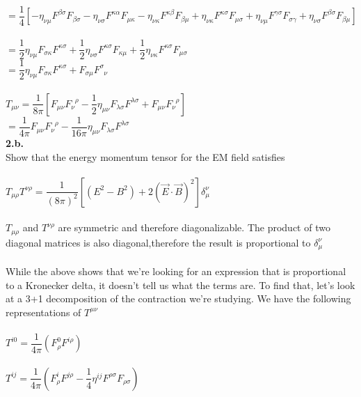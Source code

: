 \documentclass[prb,preprint]
{revtex4-1}
\newcommand{\PRLsep}{\noindent\makebox[\linewidth]{\resizebox{0.8888\linewidth}{2pt}{$\bullet$}}\bigskip}
\begin{document}
\\
$= \dfrac{1}{4}\left[-\eta_{\nu\mu}F^{\beta\sigma}F_{\beta\sigma} - \eta_{\nu\sigma}F^{\kappa\alpha}F_{\mu\kappa} - \eta_{\nu\kappa}F^{\kappa\beta}F_{\beta\mu} + \eta_{\nu\kappa}F^{\kappa\sigma}F_{\mu\sigma} + \eta_{\nu\mu}F^{\gamma\sigma}F_{\sigma\gamma} + \eta_{\nu\sigma}F^{\beta\sigma}F_{\beta\mu} \right]$
\\
\\
$ = \dfrac{1}{2}\eta_{\nu\mu}F_{\sigma\kappa}F^{\kappa\sigma} + \dfrac{1}{2}\eta_{\nu\sigma}F^{\kappa\sigma}F_{\kappa\mu} + \dfrac{1}{2}\eta_{\nu\kappa}F^{\kappa\sigma}F_{\mu\sigma}$
\\
$ = \dfrac{1}{2}\eta_{\nu\mu}F_{\sigma\kappa}F^{\kappa\sigma} + F_{\sigma\mu}F^{\sigma}_{\;\;\nu}$
\\
\\
$T_{\mu\nu} = \dfrac{1}{8\pi}\left[F_{\mu\nu}F_\nu^{\;\;\rho} - \dfrac{1}{2}\eta_{\mu\nu}F_{\lambda\sigma}F^{\lambda\sigma}+F_{\mu\nu}F_\nu^{\;\;\rho}\right]$
\\
$ = \dfrac{1}{4\pi}F_{\mu\nu}F_\nu^{\;\;\rho} - \dfrac{1}{16\pi}\eta_{\mu\nu}F_{\lambda\sigma}F^{\lambda\sigma}$
\\
\PRLsep
\newpage
\textbf{2.b.}
\\
Show that the energy momentum tensor for the EM field satisfies
\\
\\
$T_{\mu\rho}T^{\nu\rho} = \dfrac{1}{\left(8\pi\right)^2}\left[\left(E^2 - B^2\right) + 2\left(\vec{E}\cdot\vec{B}\right)^2\right]\delta_\mu^\nu$
\\
\\
$T_{\mu\rho}$ and $T^{\nu\rho}$ are symmetric and therefore diagonalizable.  The product of two diagonal matrices is also diagonal,therefore the result is proportional to $\delta_\mu^\nu$
\\
\\
While the above shows that we're looking for an expression that is proportional to a Kronecker delta, it doesn't tell us what the terms are.  To find that, let's look at a 3+1 decomposition of the contraction we're studying.  We have the following representations of $T^{\mu\nu}$
\\
\\
$T^{i0} = \dfrac{1}{4\pi}\left(F^0_\rho F^{i\rho}\right)$
\\
\\
$T^{ij} = \dfrac{1}{4\pi}\left(F^i_\rho F^{j\rho} - \dfrac{1}{4}\eta^{ij} F^{\rho\sigma}F_{\rho\sigma}\right)$
\\
\end{document}
